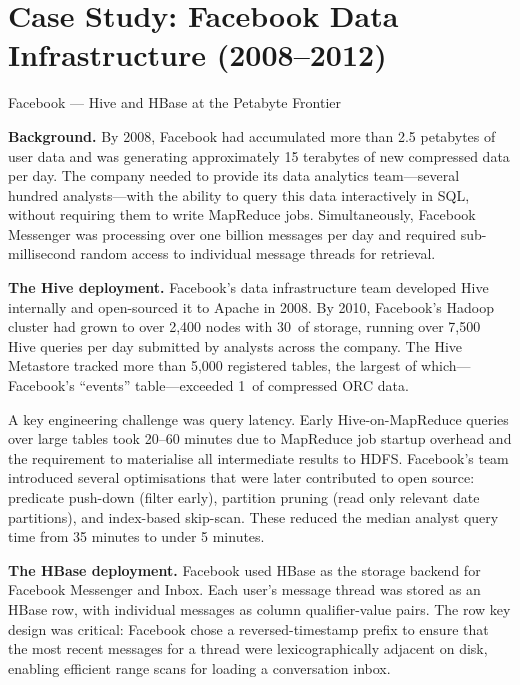 \section{Case Study: Facebook Data Infrastructure (2008--2012)}
\label{sec:facebook-case}

\begin{casestudy}{Facebook --- Hive and HBase at the Petabyte Frontier}

\textbf{Background.}
By 2008, Facebook had accumulated more than 2.5 petabytes of user data
and was generating approximately 15 terabytes of new compressed data
per day. The company needed to provide its data analytics team---several
hundred analysts---with the ability to query this data interactively
in SQL, without requiring them to write MapReduce jobs. Simultaneously,
Facebook Messenger was processing over one billion messages per day and
required sub-millisecond random access to individual message threads
for retrieval.

\smallskip
\textbf{The Hive deployment.}
Facebook's data infrastructure team developed Hive internally and
open-sourced it to Apache in 2008. By 2010, Facebook's Hadoop cluster
had grown to over 2,400 nodes with 30\PB\ of storage, running over
7,500 Hive queries per day submitted by analysts across the company.
The Hive Metastore tracked more than 5,000 registered tables, the
largest of which---Facebook's ``events'' table---exceeded 1\PB\ of
compressed ORC data.

A key engineering challenge was query latency. Early Hive-on-MapReduce
queries over large tables took 20--60 minutes due to MapReduce job
startup overhead and the requirement to materialise all intermediate
results to HDFS. Facebook's team introduced several optimisations
that were later contributed to open source: predicate push-down
(filter early), partition pruning (read only relevant date partitions),
and index-based skip-scan. These reduced the median analyst query
time from 35 minutes to under 5 minutes.

\smallskip
\textbf{The HBase deployment.}
Facebook used HBase as the storage backend for Facebook Messenger
and Inbox. Each user's message thread was stored as an HBase row,
with individual messages as column qualifier-value pairs. The row
key design was critical: Facebook chose a reversed-timestamp prefix
to ensure that the most recent messages for a thread were
lexicographically adjacent on disk, enabling efficient range scans
for loading a conversation inbox.


\end{casestudy}
